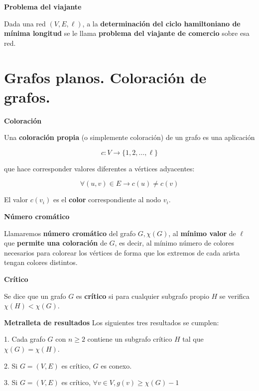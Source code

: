 \documentclass[openany]{book}
\begin{document}
\begin{definition}{ \color{turquoise} \textbf{Problema del viajante}}

  Dada una red $(V, E, \ell)$, a la \textbf{determinación del ciclo hamiltoniano de mínima longitud} se le llama \textbf{problema del viajante de comercio} sobre esa red.
\end{definition}

\chapter{Grafos planos. Coloración de grafos.}

\begin{definition}{ \color{turquoise} \textbf{Coloración}}

  Una \textbf{coloración propia} (o simplemente coloración) de un grafo es una aplicación

  $$
  c: V \longrightarrow\{1,2, \ldots, \ell\}
  $$

  que hace corresponder valores diferentes a vértices adyacentes:

  $$
  \forall(u, v) \in E \rightarrow c(u) \neq c(v)
  $$

  El valor $c\left(v_{i}\right)$ es el \textbf{color} correspondiente al nodo $v_{i}$.

\end{definition}

\begin{definition}{ \color{turquoise} \textbf{Número cromático}}

  Llamaremos \textbf{número cromático} del grafo $G, \chi(G)$, al \textbf{mínimo valor} de $\ell$ que \textbf{permite una coloración} de $G$, es decir, al mínimo número de colores necesarios para colorear los vértices de forma que los extremos de cada arista tengan colores distintos.

\end{definition}

\begin{definition}{ \color{turquoise} \textbf{Crítico}}


  Se dice que un grafo $G$ es \textbf{crítico} si para cualquier subgrafo propio $H$ se verifica $\chi(H)<\chi(G)$.
\end{definition}
\newpage
\begin{proposition}{ \color{turquoise} \textbf{Metralleta de resultados}}
 Los siguientes tres resultados se cumplen:


  1. Cada grafo $G$ con $n \geq 2$ contiene un subgrafo crítico $H$ tal que $\chi(G)=\chi(H)$.

  2. Si $G=(V, E)$ es crítico, $G$ es conexo.

  3. Si $G=(V, E)$ es crítico, $\forall v \in V, g(v) \geq \chi(G)-1$

\end{proposition}
\end{document}
